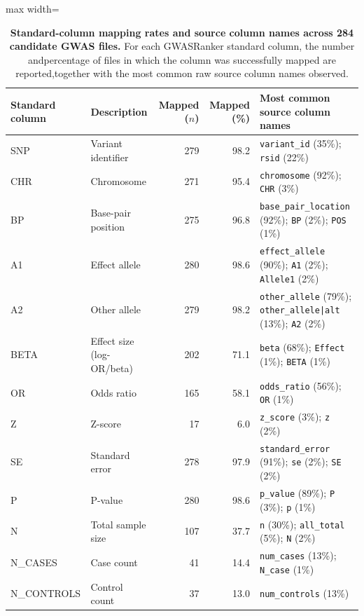 \documentclass[11pt,a4paper]{article}
\begin{document}
\begin{table}[H]
\centering
\caption{\textbf{Standard-column mapping rates and source column names across 284 candidate GWAS files.} For each GWASRanker standard column, the number andpercentage of files in which the column was successfully mapped are reported,together with the most common raw source column names observed.}
\label{tab}
\small
\begin{adjustbox}{max width=\textwidth}
\begin{tabular}{llrrl}
\toprule
\textbf{Standard column} & \textbf{Description} & \textbf{Mapped ($n$)} &\textbf{Mapped (\%)} & \textbf{Most common source column names} \\
\midrule
SNP   & Variant identifier        & 279 & 98.2 & \texttt{variant\_id} (35\%); \texttt{rsid} (22\%) \\
CHR   & Chromosome                & 271 & 95.4 & \texttt{chromosome} (92\%); \texttt{CHR} (3\%) \\
BP    & Base-pair position        & 275 & 96.8 & \texttt{base\_pair\_location} (92\%); \texttt{BP} (2\%); \texttt{POS} (1\%) \\
A1    & Effect allele             & 280 & 98.6 & \texttt{effect\_allele} (90\%); \texttt{A1} (2\%); \texttt{Allele1} (2\%) \\
A2    & Other allele              & 279 & 98.2 & \texttt{other\_allele} (79\%); \texttt{other\_allele|alt} (13\%); \texttt{A2} (2\%) \\
BETA  & Effect size (log-OR/beta) & 202 & 71.1 & \texttt{beta} (68\%); \texttt{Effect} (1\%); \texttt{BETA} (1\%) \\
OR    & Odds ratio                & 165 & 58.1 & \texttt{odds\_ratio} (56\%); \texttt{OR} (1\%) \\
Z     & Z-score                   &  17 &  6.0 & \texttt{z\_score} (3\%); \texttt{z} (2\%) \\
SE    & Standard error            & 278 & 97.9 & \texttt{standard\_error} (91\%); \texttt{se} (2\%); \texttt{SE} (2\%) \\
P     & P-value                   & 280 & 98.6 & \texttt{p\_value} (89\%); \texttt{P} (3\%); \texttt{p} (1\%) \\
N     & Total sample size         & 107 & 37.7 & \texttt{n} (30\%); \texttt{all\_total} (5\%); \texttt{N} (2\%) \\
N\_CASES    & Case count          &  41 & 14.4 & \texttt{num\_cases} (13\%); \texttt{N\_case} (1\%) \\
N\_CONTROLS & Control count       &  37 & 13.0 & \texttt{num\_controls} (13\%) \\

\end{tabular}
\end{adjustbox}
\end{table}
\end{document}
